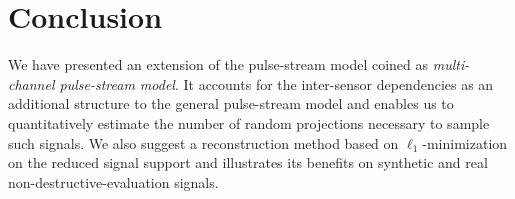 \documentclass{article}
\theoremstyle{definition}
\begin{document}
\section{Conclusion}
\label{sec_concl}
We have presented an extension of the pulse-stream model coined as \textit{multi-channel pulse-stream model}. It accounts for the inter-sensor dependencies as an additional structure to the general pulse-stream model and enables us to quantitatively estimate the number of random projections necessary to sample such signals. We also suggest a reconstruction method based on $\ell_1$-minimization on the reduced signal support and illustrates its benefits on synthetic and real non-destructive-evaluation signals.






%





\end{document}

